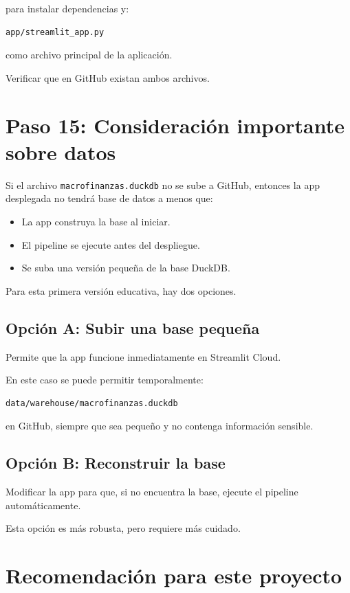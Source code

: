 para instalar dependencias y:

\begin{verbatim}
app/streamlit_app.py
\end{verbatim}

como archivo principal de la aplicación.

Verificar que en GitHub existan ambos archivos.

\section{Paso 15: Consideración importante sobre datos}

Si el archivo \texttt{macrofinanzas.duckdb} no se sube a GitHub, entonces la app desplegada no tendrá base de datos a menos que:

\begin{itemize}
\item La app construya la base al iniciar.
\item El pipeline se ejecute antes del despliegue.
\item Se suba una versión pequeña de la base DuckDB.
\end{itemize}

Para esta primera versión educativa, hay dos opciones.

\subsection{Opción A: Subir una base pequeña}

Permite que la app funcione inmediatamente en Streamlit Cloud.

En este caso se puede permitir temporalmente:

\begin{verbatim}
data/warehouse/macrofinanzas.duckdb
\end{verbatim}

en GitHub, siempre que sea pequeño y no contenga información sensible.

\subsection{Opción B: Reconstruir la base}

Modificar la app para que, si no encuentra la base, ejecute el pipeline automáticamente.

Esta opción es más robusta, pero requiere más cuidado.

\section{Recomendación para este proyecto}


